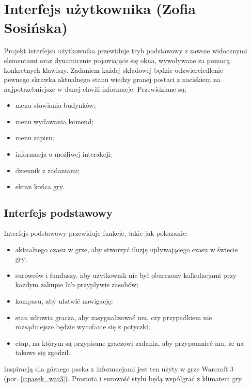 \section{Interfejs użytkownika (Zofia Sosińska)}\label{chap:ui}
Projekt interfejsu użytkownika przewiduje tryb podstawowy z zawsze widocznymi elementami oraz dynamicznie pojawiające się okna, wywoływane za pomocą konkretnych klawiszy. 
 Zadaniem każdej składowej będzie odzwierciedlenie pewnego skrawka aktualnego stanu wiedzy granej postaci z naciskiem na najpotrzebniejsze w danej chwili informacje. Przewidziane są:
 \begin{itemize}
    \item menu stawiania budynków; 
    \item menu wydawania komend;
    \item menu zapisu;
    \item informacja o możliwej interakcji;
    \item dziennik z zadaniami;
    \item ekran końca gry.
\end{itemize}
	
\subsection{Interfejs podstawowy}
Interfejs podstawowy przewiduje funkcje, takie jak pokazanie:
\begin{itemize}
    \item aktualnego czasu w grze, aby stworzyć iluzję upływającego czasu w świecie gry; 
    \item surowców i funduszy, aby użytkownik nie był obarczony kalkulacjami przy każdym zakupie lub przypływie zasobów;
    \item kompasu, aby ułatwić nawigację;
    \item stan zdrowia gracza, aby zasygnalizować mu, czy przypadkiem nie rozsądniejsze będzie wycofanie się z potyczki;
    \item etap, na którym są przypisane graczowi zadania, aby przypomnieć mu, że na takowe się zgodził.
\end{itemize}
Inspiracją dla górnego paska z informacjami jest ten użyty w grze Warcraft 3 (por. \ref{c:pasek_war3}). Prostota i surowość stylu będą współgrać z klimatem gry.

